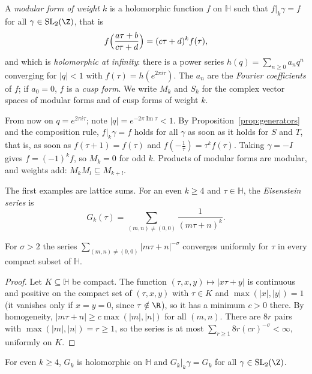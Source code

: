 \begin{definition}\label{def:modform}
A \emph{modular form of weight $k$} is a holomorphic function $f$ on $\mathbb H$ such that $f|_k\gamma=f$ for all $\gamma\in\mathrm{SL}_2(\Z)$, that is
\[
f\Bigl(\frac{a\tau+b}{c\tau+d}\Bigr)=(c\tau+d)^kf(\tau),
\]
and which is \emph{holomorphic at infinity}: there is a power series $h(q)=\sum_{n\ge0}a_nq^n$ converging for $|q|<1$ with $f(\tau)=h(e^{2\pi i\tau})$. The $a_n$ are the \emph{Fourier coefficients} of $f$; if $a_0=0$, $f$ is a
\emph{cusp form}. We write $M_k$ and $S_k$ for the complex vector spaces of modular forms and of cusp forms of weight $k$.
\end{definition}

From now on $q=e^{2\pi i\tau}$; note $|q|=e^{-2\pi\operatorname{Im}\tau}<1$. By Proposition~\ref{prop:generators} and the composition rule, $f|_k\gamma=f$ holds for all $\gamma$ as soon as it holds for $S$ and $T$, that is,
as soon as $f(\tau+1)=f(\tau)$ and $f(-\frac1\tau)=\tau^kf(\tau)$. Taking $\gamma=-I$ gives $f=(-1)^kf$, so $M_k=0$ for odd $k$. Products of modular forms are modular, and weights add: $M_kM_l\subseteq M_{k+l}$.

The first examples are lattice sums. For an even $k\ge4$ and $\tau\in\mathbb H$, the \emph{Eisenstein series} is
\[
G_k(\tau)=\sum_{(m,n)\ne(0,0)}\frac1{(m\tau+n)^k}.
\]

\begin{lemma}\label{lem:latticesum}
For $\sigma>2$ the series $\sum_{(m,n)\ne(0,0)}|m\tau+n|^{-\sigma}$ converges uniformly for $\tau$ in every compact subset of $\mathbb H$.
\end{lemma}

\begin{proof}
Let $K\subseteq\mathbb H$ be compact. The function $(\tau,x,y)\mapsto|x\tau+y|$ is continuous and positive on the compact set of $(\tau,x,y)$ with $\tau\in K$ and $\max(|x|,|y|)=1$ (it vanishes only if $x=y=0$, since $\tau\notin\R$),
so it has a minimum $c>0$ there. By homogeneity, $|m\tau+n|\ge c\max(|m|,|n|)$ for all $(m,n)$. There are $8r$ pairs with $\max(|m|,|n|)=r\ge1$, so the series is at most $\sum_{r\ge1}8r(cr)^{-\sigma}<\infty$, uniformly on $K$.
\end{proof}

\begin{proposition}\label{prop:eisenstein}
For even $k\ge4$, $G_k$ is holomorphic on $\mathbb H$ and $G_k|_k\gamma=G_k$ for all $\gamma\in\mathrm{SL}_2(\Z)$.
\end{proposition}

